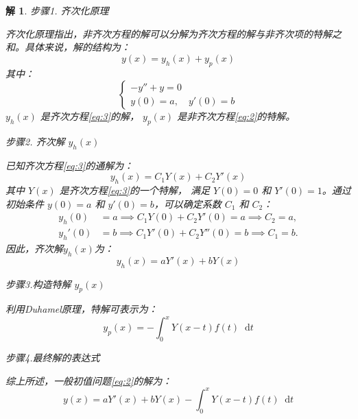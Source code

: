 \documentclass[12pt,a4paper]{article}
\newcommand{\diff}{\mathop{}\!\mathrm{d}}  %
\newtheorem*{solution}{解}
\begin{document}
\begin{solution}
	
步骤1. 齐次化原理

\noindent 
齐次化原理指出，非齐次方程的解可以分解为齐次方程的解与非齐次项的特解之和。具体来说，解的结构为：
	\[
	y(x) = y_h(x) + y_p(x)
	\]
	其中：
	\begin{equation}\label{eq:3}
		\begin{cases}
			-y'' + y = 0 \\
			y(0) = a, \quad y'(0) = b
		\end{cases}
	\end{equation}
 \( y_h(x) \) 是齐次方程\eqref{eq:3}的解，
\( y_p(x) \) 是非齐次方程\eqref{eq:2}的特解。
	
	步骤2. 齐次解 \( y_h(x) \)
	
\noindent	
已知齐次方程\eqref{eq:3}的通解为：
	\[
	y_h(x) = C_1 Y(x) + C_2 Y'(x)
	\]
	其中 \( Y(x) \) 是齐次方程\eqref{eq:3}的一个特解，
	满足 \( Y(0) = 0 \) 和 \( Y'(0) = 1 \)。通过初始条件 \( y(0) = a \) 和 \( y'(0) = b \)，可以确定系数 \( C_1 \) 和 \( C_2 \)：
	\[
	\begin{aligned}
		y_h(0) &= a \implies C_1 Y(0) + C_2 Y'(0) = a \implies C_2 = a, \\
		y_h'(0) &= b \implies C_1 Y'(0) + C_2 Y''(0) = b \implies C_1 = b.
	\end{aligned}
	\]
	因此，齐次解$y_h(x)$为：
	\[
	y_h(x) = a Y'(x) + b Y(x)
	\]
	
	
	步骤3.构造特解 $y_p(x)$
	
\noindent 
利用Duhamel原理，特解可表示为：
	\[
	y_p(x) = -\int_0^x Y(x-t)f(t)\diff t
	\]
	
步骤4.最终解的表达式
	
	\noindent
	综上所述，一般初值问题\eqref{eq:2}的解为：
	\[
	y(x) = a Y'(x) + b Y(x) - \int_{0}^{x} Y(x-t) f(t) \diff t
	\]

\end{solution}
	
	\newpage
	
\end{document}
